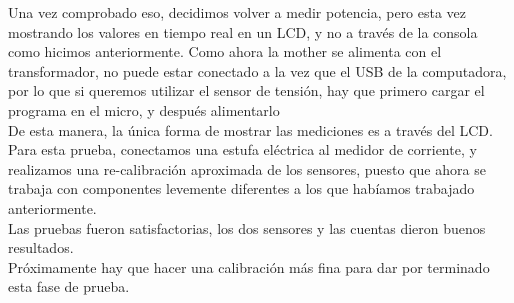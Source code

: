 Una vez comprobado eso, decidimos volver a medir potencia, pero esta vez mostrando los valores en tiempo real en un LCD, y no a través de la consola como hicimos anteriormente. Como ahora la mother se alimenta con el transformador, no puede estar conectado a la vez que el USB de la computadora, por lo que si queremos utilizar el sensor de tensión, hay que primero cargar el programa en el micro, y después alimentarlo\\

De esta manera, la única forma de mostrar las mediciones es a través del LCD.\\

Para esta prueba, conectamos una estufa eléctrica al medidor de corriente, y realizamos una re-calibración aproximada de los sensores, puesto que ahora se trabaja con componentes levemente diferentes a los que habíamos trabajado anteriormente.\\

Las pruebas fueron satisfactorias, los dos sensores y las cuentas dieron buenos resultados.\\

Próximamente hay que hacer una calibración más fina para dar por terminado esta fase de prueba.\\

